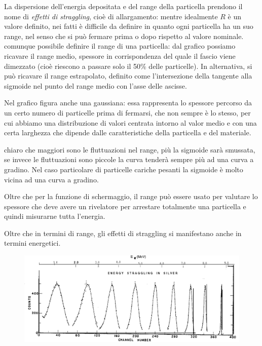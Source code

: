 \vspace{-0.4cm}

La dispersione dell'energia depositata e del range della particella prendono il nome di \textit{effetti di straggling}, cioè di allargamento: mentre idealmente $R$ è un valore definito, nei fatti è difficile da definire in quanto ogni particella ha un suo range, nel senso che si può fermare prima o dopo rispetto al valore nominale. \E comunque possibile definire il range di una particella: dal grafico possiamo ricavare il range medio, spessore in corrispondenza del quale il fascio viene dimezzato (cioè riescono a passare solo il 50\% delle particelle). In alternativa, si può ricavare il range estrapolato, definito come l'intersezione della tangente alla sigmoide nel punto del range medio con l'asse delle ascisse.

Nel grafico figura anche una gaussiana: essa rappresenta lo spessore percorso da un certo numero di particelle prima di fermarsi, che non sempre è lo stesso, per cui abbiamo una distribuzione di valori centrata intorno al valor medio e con una certa larghezza che dipende dalle caratteristiche della particella e del materiale.

\E chiaro che maggiori sono le fluttuazioni nel range, più la sigmoide sarà smussata, se invece le fluttuazioni sono piccole la curva tenderà sempre più ad una curva a gradino. Nel caso particolare di particelle cariche pesanti la sigmoide è molto vicina ad una curva a gradino.

Oltre che per la funzione di schermaggio, il range può essere usato per valutare lo spessore che deve avere un rivelatore per arrestare totalmente una particella e quindi misurarne tutta l'energia.

Oltre che in termini di range, gli effetti di straggling si manifestano anche in termini energetici.

\begin{figure}[H]
    \centering
    \includegraphics[width=12cm]{immagini/straggling_energie.png}
\end{figure}

